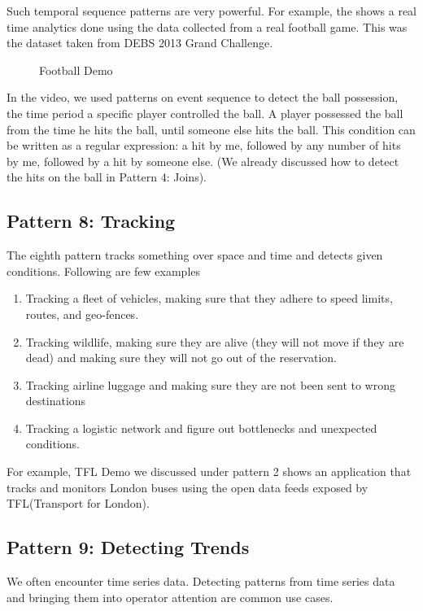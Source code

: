 \documentclass{sig-alternate}
\begin{document}
Such temporal sequence patterns are very powerful. For example, the \cite{footballDemo} shows a real time analytics done using the data collected from a real football game. This was the dataset taken from DEBS 2013 Grand Challenge. 

\begin{figure}[!htbp]
\centering
{}
\caption{Football Demo}
\label{fig:q2}
\end{figure}

In the video, we used patterns on event sequence to detect the ball possession, the time period a specific player controlled the ball. A player possessed the ball from the time he hits the ball, until someone else hits the ball. This condition can be written as a regular expression: a hit by me, followed by any number of hits by me, followed by a hit by someone else.  (We already discussed how to detect the hits on the ball in Pattern 4: Joins).  

\subsection{Pattern 8: Tracking}
The eighth pattern tracks something over space and time and detects given conditions. Following are few examples 
\begin{enumerate}
\item Tracking a fleet of vehicles, making sure that they adhere to speed limits, routes,  and geo-fences. 
\item Tracking wildlife, making sure they are alive (they will not move if they are dead) and making sure they will not go out of the reservation. 
\item Tracking airline luggage and making sure they are not been sent to wrong destinations
\item Tracking a logistic network and figure out bottlenecks and unexpected conditions. 
\end{enumerate}

For example, TFL Demo we discussed under pattern 2 shows an application that tracks and monitors London buses using the open data feeds exposed by TFL(Transport for London). 


\subsection{Pattern 9: Detecting Trends}
We often encounter time series data. Detecting patterns from time series data and bringing them into operator attention are common use cases. 
\end{document}
